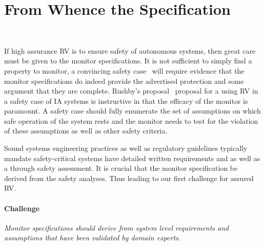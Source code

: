 \section{From Whence the Specification}~\label{sec:req}

If high assurance RV is to ensure safety of autonomous systems, then great care must be given to
the monitor specifications.  It is not sufficient to simply find a property
to monitor, a convincing safety case~\cite{Kelly98arguingsafety} will
require evidence that the monitor specifications do indeed provide the
advertised protection and some argument that they are complete.
Rushby's proposal~\cite{rvRushby,RushbyAIAA09} proposal for a using RV
in a safety case of IA systems is instructive in that the efficacy of
the monitor is paramount.  A safety case should fully enumerate the
set of assumptions on which safe operation of the system rests and the
monitor needs to test for the violation of these assumptions as well
as other safety criteria. 


 Sound systems engineering practices  as well
as regulatory guidelines typically mandate safety-critical systems
have detailed written requirements and as well as a through safety
assessment.  It is crucial that the monitor specification be derived
from the safety analyses. Thus leading to our first challenge for
assured RV.

\paragraph{Challenge}   \emph{ Monitor specifications should derive from
  system level requirements and assumptions that have been validated
  by domain experts.} 

